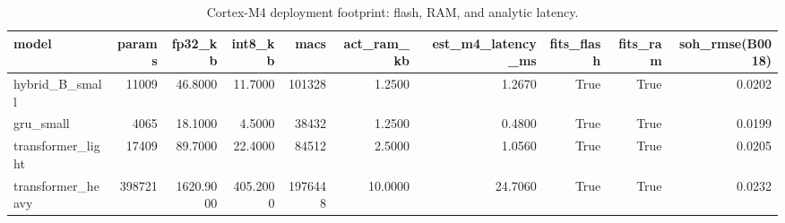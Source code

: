 \begin{table}
\caption{Cortex-M4 deployment footprint: flash, RAM, and analytic latency.}
\label{tab:cortex_m4_footprint}
\begin{tabular}{lrrrrrrrrr}
\toprule
model & params & fp32\_kb & int8\_kb & macs & act\_ram\_kb & est\_m4\_latency\_ms & fits\_flash & fits\_ram & soh\_rmse(B0018) \\
\midrule
hybrid\_B\_small & 11009 & 46.8000 & 11.7000 & 101328 & 1.2500 & 1.2670 & True & True & 0.0202 \\
gru\_small & 4065 & 18.1000 & 4.5000 & 38432 & 1.2500 & 0.4800 & True & True & 0.0199 \\
transformer\_light & 17409 & 89.7000 & 22.4000 & 84512 & 2.5000 & 1.0560 & True & True & 0.0205 \\
transformer\_heavy & 398721 & 1620.9000 & 405.2000 & 1976448 & 10.0000 & 24.7060 & True & True & 0.0232 \\
\bottomrule
\end{tabular}
\end{table}
